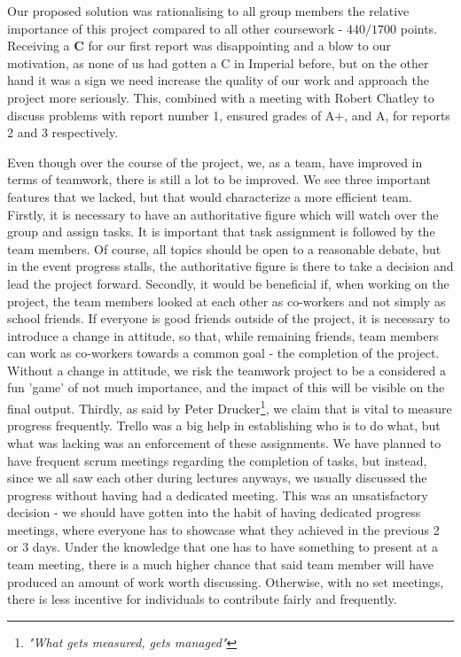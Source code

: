 \documentclass{report}
\begin{document}
		Our proposed solution was rationalising to all group members the relative importance of this project compared to all other coursework - $440/1700$ points. Receiving a \textbf{C} for our first report was disappointing and a blow to our motivation, as none of us had gotten a C in Imperial before, but on the other hand it was a sign we need increase the quality of our work and approach the project more seriously. This, combined with a meeting with Robert Chatley to discuss problems with report number 1, ensured grades of A+, and A, for reports 2 and 3 respectively. 
		
		Even though over the course of the project, we, as a team, have improved in terms of teamwork, there is still a lot to be improved. We see three important features that we lacked, but that would characterize a more efficient team. Firstly, it is necessary to have an authoritative figure which will watch over the group and assign tasks. It is important that task assignment is followed by the team members. Of course, all topics should be open to a reasonable debate, but in the event progress stalls, the authoritative figure is there to take a decision and lead the project forward. Secondly, it would be beneficial if, when working on the project, the team members looked at each other as co-workers and not simply as school friends. If everyone is good friends outside of the project, it is necessary to introduce a change in attitude, so that, while remaining friends, team members can work as co-workers towards a common goal - the completion of the project. Without a change in attitude, we risk the teamwork project to be a considered a fun 'game' of not much importance, and the impact of this will be visible on the final output. Thirdly, as said by Peter Drucker\footnote{\emph{"What gets measured, gets managed"}}, we claim that is vital to measure progress frequently. Trello was a big help in establishing who is to do what, but what was lacking was an enforcement of these assignments. We have planned to have frequent scrum meetings regarding the completion of tasks, but instead, since we all saw each other during lectures anyways, we usually discussed the progress without having had a dedicated meeting. This was an unsatisfactory decision - we should have gotten into the habit of having dedicated progress meetings, where everyone has to showcase what they achieved in the previous 2 or 3 days. Under the knowledge that one has to have something to present at a team meeting, there is a much higher chance that said team member will have produced an amount of work worth discussing. Otherwise, with no set meetings, there is less incentive for individuals to contribute fairly and frequently.
\end{document}
